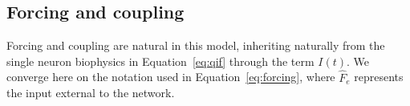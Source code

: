 \documentclass[12pt]{article}
\numberwithin{equation}{section}
\newcommand{\rev}[1]{\begingroup\color{navyblue}#1\endgroup}
\begin{document}

\subsection{Forcing and coupling}
Forcing and coupling are natural in this model, inheriting naturally from the single neuron biophysics in Equation~\ref{eq:qif} through the term $I(t)$. We converge here on the notation used in Equation~\ref{eq:forcing}, where $\hat F_e$ represents the input external to the network.


\end{document}
